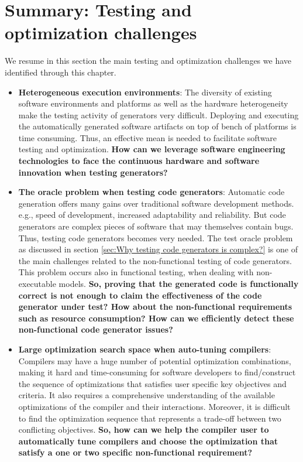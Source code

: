 \section{Summary: Testing and optimization challenges}
We resume in this section the main testing and optimization challenges we have identified through this chapter.
\begin{itemize}
	\item \textbf{Heterogeneous execution environments}: 
	The diversity of existing software environments and platforms as well as the hardware heterogeneity make the testing activity of generators very difficult. Deploying and executing the automatically generated software artifacts on top of bench of platforms is time consuming. Thus, an effective mean is needed to facilitate software testing and optimization.
	\textbf{How can we leverage software engineering technologies to face the continuous hardware and software innovation when testing generators?} 
	
    \item \textbf{The oracle problem when testing code generators}: 	
	Automatic code generation offers many gains over traditional software development methods. e.g., speed of development, increased adaptability and reliability. But code generators are complex pieces of software that may themselves contain bugs. Thus, testing code generators becomes very needed. The test oracle problem as discussed in section \ref{sec:Why testing code generators is complex?} is one of the main challenges related to the non-functional testing of code generators. This problem occurs also in functional testing, when dealing with non-executable models.
	\textbf{
	So, proving that the generated code is functionally correct is not enough to claim the effectiveness of the code generator under test? How about the non-functional requirements such as resource consumption?
	How can we efficiently detect these non-functional code generator issues?}
	
	\item \textbf{Large optimization search space when auto-tuning compilers}: 
	Compilers may have a huge number of potential optimization combinations, making it hard and time-consuming for software developers to find/construct the sequence of optimizations that satisfies user specific key objectives and criteria. It also requires a comprehensive understanding of the available optimizations of the compiler and their interactions. Moreover, it is difficult to find the optimization sequence that represents a trade-off between two conflicting objectives.  
	\textbf{So, how can we help the compiler user to automatically tune compilers and choose the optimization that satisfy a one or two specific non-functional requirement? }
	

\end{itemize}
